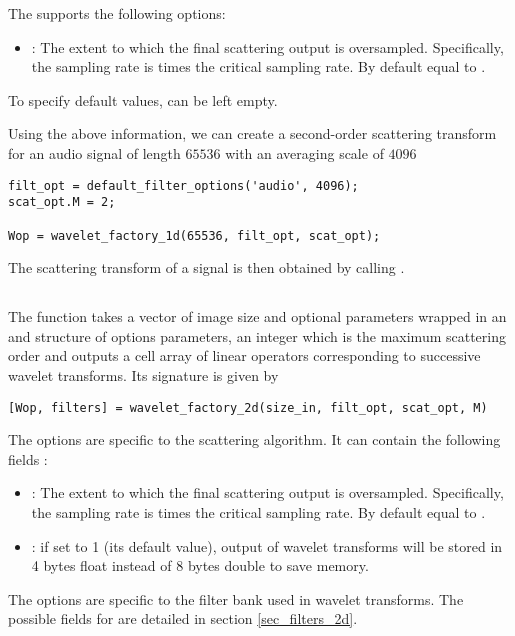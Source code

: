 \documentclass[twocolumn]{article}
\begin{document}
The  supports the following options:
\begin{itemize}
	\item {}: The extent to which the final scattering output is oversampled. Specifically, the sampling rate is  times the critical sampling rate. By default equal to .
\end{itemize}
To specify default values,  can be left empty.

Using the above information, we can create a second-order scattering transform for an audio signal of length $65536$ with an averaging scale of $4096$
\begin{lstlisting}
filt_opt = default_filter_options('audio', 4096);
scat_opt.M = 2;

Wop = wavelet_factory_1d(65536, filt_opt, scat_opt);
\end{lstlisting}
The scattering transform of a signal  is then obtained by calling .

\subsection{}
The  function takes a  vector of image size and optional parameters wrapped in an  and  structure of options parameters, an integer  which is the maximum scattering order and outputs a cell array of linear operators corresponding to successive wavelet transforms. Its signature  is given by
\begin{lstlisting}
[Wop, filters] = wavelet_factory_2d(size_in, filt_opt, scat_opt, M)
\end{lstlisting}
The  options are specific to the scattering algorithm. It can contain the following fields :
\begin{itemize}
	\item {}: The extent to which the final scattering output is oversampled. Specifically, the sampling rate is  times the critical sampling rate. By default equal to .
	\item {}: if set to 1 (its default value), output of wavelet transforms will be stored in 4 bytes float instead of 8 bytes double to save memory.
\end{itemize}
The  options are specific to the filter bank used in wavelet transforms. The possible fields for  are detailed in section \ref{sec_filters_2d}.
\end{document}
